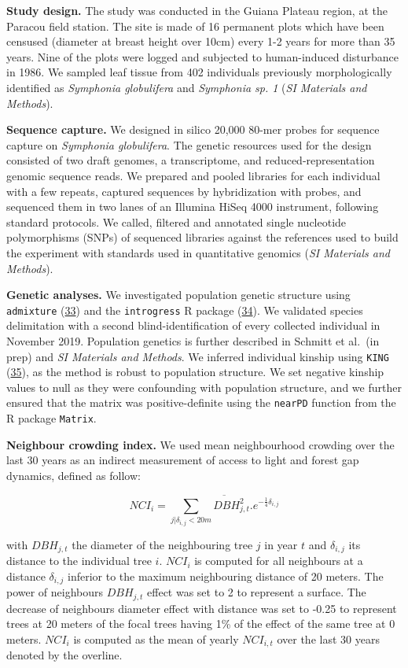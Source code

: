 \documentclass[
]{article}
\begin{document}
\textbf{Study design.}
The study was conducted in the Guiana Plateau region, at the Paracou field station.
The site is made of 16 permanent plots which have been censused (diameter at breast height over 10cm) every 1-2 years for more than 35 years.
Nine of the plots were logged and subjected to human-induced disturbance in 1986.
We sampled leaf tissue from 402 individuals previously morphologically identified as \emph{Symphonia globulifera} and \emph{Symphonia sp. 1} (\emph{SI Materials and Methods}).

\textbf{Sequence capture.}
We designed in silico 20,000 80-mer probes for sequence capture on \emph{Symphonia globulifera}.
The genetic resources used for the design consisted of two draft genomes, a transcriptome, and reduced-representation genomic sequence reads.
We prepared and pooled libraries for each individual with a few repeats,
captured sequences by hybridization with probes,
and sequenced them in two lanes of an Illumina HiSeq 4000 instrument, following standard protocols.
We called, filtered and annotated single nucleotide polymorphisms (SNPs) of sequenced libraries against the references used to build the experiment with standards used in quantitative genomics (\emph{SI Materials and Methods}).

\textbf{Genetic analyses.}
We investigated population genetic structure using \texttt{admixture} (\protect\hyperlink{ref-Alexander2011}{33})
and the \texttt{introgress} R package (\protect\hyperlink{ref-Gompert2010}{34}).
We validated species delimitation with a second blind-identification of every collected individual in November 2019.
Population genetics is further described in Schmitt et al.~(in prep) and \emph{SI Materials and Methods}.
We inferred individual kinship using \texttt{KING} (\protect\hyperlink{ref-Manichaikul2010}{35}),
as the method is robust to population structure.
We set negative kinship values to null as they were confounding with population structure,
and we further ensured that the matrix was positive-definite using the \texttt{nearPD} function from the R package \texttt{Matrix}.

\textbf{Neighbour crowding index.}
We used mean neighbourhood crowding over the last 30 years as an indirect measurement of access to light and forest gap dynamics, defined as follow:

\[NCI_i=\overline{\sum_{j|\delta_{i,j}<20m}DBH^2_{j,t}.e^{-\frac14\delta_{i,j}}}\]

with \(DBH_{j,t}\) the diameter of the neighbouring tree \(j\) in year \(t\) and \(\delta_{i,j}\) its distance to the individual tree \(i\).
\(NCI_i\) is computed for all neighbours at a distance \(\delta_{i,j}\) inferior to the maximum neighbouring distance of 20 meters.
The power of neighbours \(DBH_{j,t}\) effect was set to 2 to represent a surface.
The decrease of neighbours diameter effect with distance was set to -0.25 to represent trees at 20 meters of the focal trees having 1\% of the effect of the same tree at 0 meters.
\(NCI_i\) is computed as the mean of yearly \(NCI_{i,t}\) over the last 30 years denoted by the overline.
\end{document}
